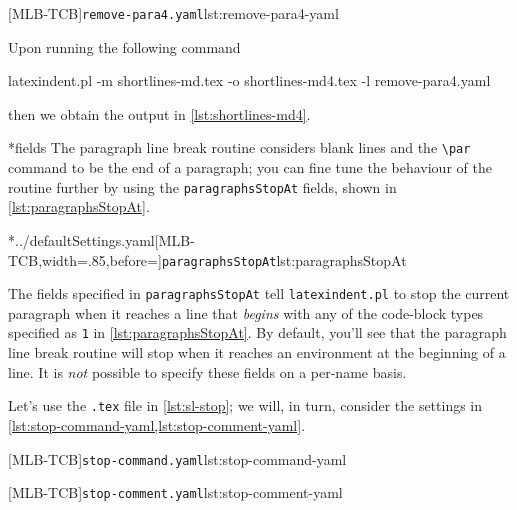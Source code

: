 	\begin{minipage}{.45\linewidth}
	\end{minipage}
	\hfill
	\begin{minipage}{.49\linewidth}
		[MLB-TCB]{\texttt{remove-para4.yaml}}{lst:remove-para4-yaml}
	\end{minipage}

	Upon running the following command
	\begin{widepage}
		\begin{commandshell}
latexindent.pl -m shortlines-md.tex -o shortlines-md4.tex -l remove-para4.yaml
\end{commandshell}
	\end{widepage}
	then we obtain the output in \cref{lst:shortlines-md4}.

*{fields}
	The paragraph line break routine considers blank lines and the \lstinline|\par| command to be the end of a paragraph;
	you can fine tune the behaviour of the routine further by using the \texttt{paragraphsStopAt} fields, shown in \cref{lst:paragraphsStopAt}.

	\cmhlistingsfromfile[style=paragraphsStopAt]*{../defaultSettings.yaml}[MLB-TCB,width=.85\linewidth,before=\centering]{\texttt{paragraphsStopAt}}{lst:paragraphsStopAt}

	The fields specified in \texttt{paragraphsStopAt} tell \texttt{latexindent.pl} to stop the current paragraph
	when it reaches a line that \emph{begins} with any of the code-block types specified as \texttt{1} in \cref{lst:paragraphsStopAt}.
	By default, you'll see that the paragraph line break routine will stop when it reaches an environment at the
	beginning of a line. It is \emph{not} possible to specify these fields on a per-name basis.

	Let's use the \texttt{.tex} file in \cref{lst:sl-stop}; we will, in turn, consider the settings in
	\cref{lst:stop-command-yaml,lst:stop-comment-yaml}.

	\begin{minipage}{.45\linewidth}
	\end{minipage}
	\hfill
	\begin{minipage}{.49\linewidth}
		[MLB-TCB]{\texttt{stop-command.yaml}}{lst:stop-command-yaml}

		[MLB-TCB]{\texttt{stop-comment.yaml}}{lst:stop-comment-yaml}
	\end{minipage}

